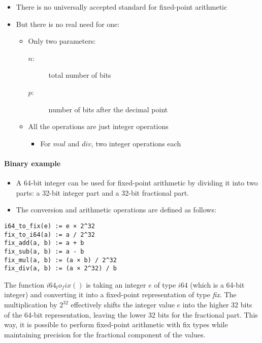 \documentclass[12pt]{article}
\begin{document}
\begin{itemize}
	\item There is no universally accepted standard for fixed-point arithmetic
	\item But there is no real need for one:
	\begin{itemize}
		\item Only two parameters:
		\begin{description}
			\item[$n$:] total number of bits
			\item[$p$:] number of bits after the decimal point
		\end{description}
		\item All the operations are just integer operations
		\begin{itemize}
			\item For $mul$ and $div$, two integer operations each
		\end{itemize}
	\end{itemize}
\end{itemize}

\paragraph{Binary example}
\begin{itemize}
    \item A 64-bit integer can be used for fixed-point arithmetic by dividing it into two parts: a 32-bit integer part and a 32-bit fractional part.
    \item The conversion and arithmetic operations are defined as follows:
\end{itemize}


\begin{verbatim}
i64_to_fix(e) := e × 2^32
fix_to_i64(a) := a / 2^32
fix_add(a, b) := a + b
fix_sub(a, b) := a - b
fix_mul(a, b) := (a × b) / 2^32
fix_div(a, b) := (a × 2^32) / b
\end{verbatim}

The function $i64_to_fix()$ is taking an integer $e$ of type $i64$ (which is a 64-bit integer) and converting it into a fixed-point representation of type \textit{fix}. The multiplication by $2^32$ effectively shifts the integer value $e$ into the higher 32 bits of the 64-bit representation, leaving the lower 32 bits for the fractional part. This way,  it is possible to perform fixed-point arithmetic with fix types while maintaining precision for the fractional component of the values.\\
\end{document}
